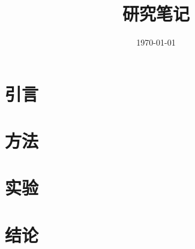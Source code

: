 \documentclass[11pt]{ctexart}
\title{研究笔记}
\author{}
\date{\today}
\begin{document}
\maketitle

\section{引言}

\section{方法}

\section{实验}

\section{结论}
\end{document}

